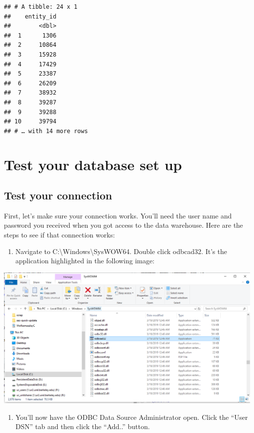 \documentclass[]{book}
\providecommand{\tightlist}{%
  \setlength{\itemsep}{0pt}\setlength{\parskip}{0pt}}
\begin{document}
\begin{verbatim}
## # A tibble: 24 x 1
##    entity_id
##        <dbl>
##  1      1306
##  2     10864
##  3     15928
##  4     17429
##  5     23387
##  6     26209
##  7     38932
##  8     39287
##  9     39288
## 10     39794
## # … with 14 more rows
\end{verbatim}

\hypertarget{appendix-appendix}{%
\appendix}


\hypertarget{test-cdw}{%
\chapter{Test your database set up}\label{test-cdw}}

\hypertarget{test-your-connection}{%
\section{Test your connection}\label{test-your-connection}}

First, let's make sure your connection works. You'll need the user name and password you received when you got access to the data warehouse. Here are the steps to see if that connection works:

\begin{enumerate}
\def\labelenumi{\arabic{enumi})}
\tightlist
\item
  Navigate to C:\textbackslash Windows\textbackslash SysWOW64. Double click odbcad32. It's the application highlighted in the following image:
\end{enumerate}

\includegraphics[width=15.67in]{images/syswow64}

\begin{enumerate}
\def\labelenumi{\arabic{enumi})}
\setcounter{enumi}{1}
\tightlist
\item
  You'll now have the ODBC Data Source Administrator open. Click the ``User DSN'' tab and then click the ``Add..'' button.
\end{enumerate}
\end{document}
